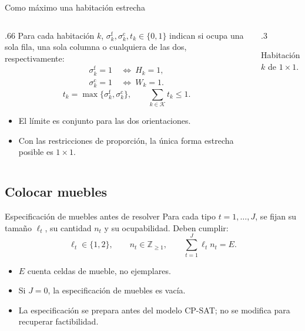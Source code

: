 \documentclass[aspectratio=169,11pt]{beamer}
\newcommand{\examplegrid}{%
  \draw[step=1,ink!35] (0,0) grid (4,4);
  \draw[ink,thick] (0,0) rectangle (4,4);
}
\begin{document}
\begin{frame}{Como m\'aximo una habitaci\'on estrecha}
  \begin{columns}[T,onlytextwidth]
  \begin{column}{.66\textwidth}
  \small
  Para cada habitaci\'on \(k\), \(\sigma_k^{\mathrm f},
  \sigma_k^{\mathrm c},t_k\in\{0,1\}\) indican si ocupa una sola fila,
  una sola columna o cualquiera de las dos, respectivamente:
  \[
    \begin{aligned}
      \sigma_k^{\mathrm f}=1&\ \Longleftrightarrow\ H_k=1,\\
      \sigma_k^{\mathrm c}=1&\ \Longleftrightarrow\ W_k=1.
    \end{aligned}
  \]
  \[
    t_k=\max\{\sigma_k^{\mathrm f},\sigma_k^{\mathrm c}\},
    \qquad \sum_{k\in\mathcal K}t_k\leq1.
  \]
  \begin{itemize}
    \setlength{\itemsep}{4mm}
    \item El l\'imite es conjunto para las dos orientaciones.
    \item Con las restricciones de proporci\'on, la \'unica forma
      estrecha posible es \(1\times1\).
  \end{itemize}
  \end{column}
  \begin{column}{.3\textwidth}
    \centering
    \par\smallskip\scriptsize Habitaci\'on \(k\) de \(1\times1\).
  \end{column}
  \end{columns}
\end{frame}

\subsection{Colocar muebles}

\begin{frame}{Especificaci\'on de muebles antes de resolver}
  Para cada tipo \(t=1,\ldots,J\), se fijan su tama\~no \(\ell_t\),
  su cantidad \(n_t\) y su ocupabilidad. Deben cumplir:
  \[
    \ell_t\in\{1,2\},\qquad n_t\in\mathbb Z_{\geq1},
    \qquad \sum_{t=1}^{J}\ell_t n_t=E.
  \]
  \begin{itemize}
    \setlength{\itemsep}{3mm}
    \item \(E\) cuenta celdas de mueble, no ejemplares.
    \item Si \(J=0\), la especificaci\'on de muebles es vac\'ia.
    \item La especificaci\'on se prepara antes del modelo CP-SAT;
      no se modifica para recuperar factibilidad.
  \end{itemize}
\end{frame}
\end{document}
